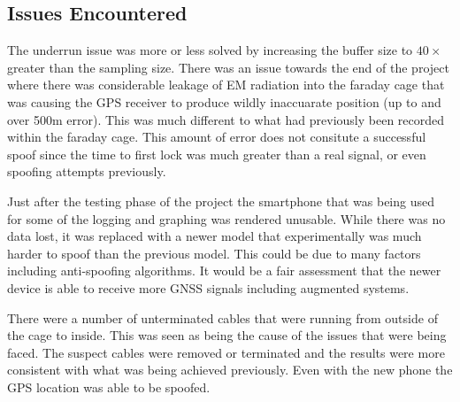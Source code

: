 \subsection{Issues Encountered}
The underrun issue was more or less solved by increasing the buffer size to $40\times$ greater than the sampling size.
There was an issue towards the end of the project where there was considerable leakage of EM radiation into the faraday cage that was causing the GPS receiver to produce
wildly inaccuarate position (up to and over 500m error). This was much different to what had previously been recorded within the faraday cage. This amount of error does
not consitute a successful spoof since the time to first lock was much greater than a real signal, or even spoofing attempts previously. 

Just after the testing phase of the project the smartphone that was being used for some of the logging and graphing was rendered unusable. While there was no data lost,
it was replaced with a newer model that experimentally was much harder to spoof than the previous model. This could be due to many factors including anti-spoofing
algorithms. It would be a fair assessment that the newer device is able to receive more GNSS signals including augmented systems.

There were a number of unterminated cables that were running from outside of the cage to inside. This was seen as being the cause of the issues that were being faced. The
suspect cables were removed or terminated and the results were more consistent with what was being achieved previously. Even with the new phone the GPS location was able
to be spoofed.